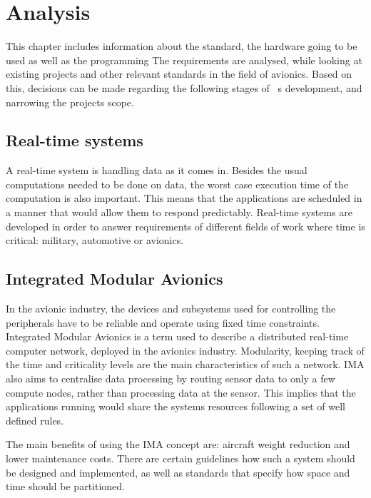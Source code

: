 
\chapter{Analysis}\label{chap:analysis}
This chapter includes information about
the standard, the hardware going to be used as well as the programming
The \arinc{} requirements are analysed, while looking at existing projects
and other relevant standards in the field of avionics. Based on this,
decisions can be made regarding the following stages of \OSname\ \textquotesingle s
development, and narrowing the project\textquotesingle s
scope.

\section{Real-time systems}
A real-time system is handling data as it comes in.
Besides the usual computations needed to be done on data,
the worst case execution time of the computation is also important.
This means that the applications are scheduled in a manner
that would allow them to respond predictably.
Real-time systems are developed in order to answer
requirements of different fields of work
where time is critical: military, automotive or avionics.

\section{Integrated Modular Avionics}
In the avionic industry, the devices and subsystems used for
controlling the peripherals have to be reliable and operate using
fixed time constraints. Integrated Modular Avionics is a term used
to describe a distributed real-time computer network,
deployed in the avionics industry\cite{ima_description}.
Modularity, keeping track of the time and criticality levels are
the main characteristics of such a network. IMA also aims to centralise data
processing by routing sensor data to only a few compute nodes, rather than
processing data at the sensor. This implies that the applications running would
share the system\textquotesingle s resources following a set of well defined
rules.

The main benefits of using the IMA concept are: aircraft weight reduction\cite{boeing_weight_reduction}
and lower maintenance costs\cite{arinc_scarlett}.
There are certain guidelines how such a system
should be designed and implemented, as well as standards that specify
how space and time should be partitioned.

